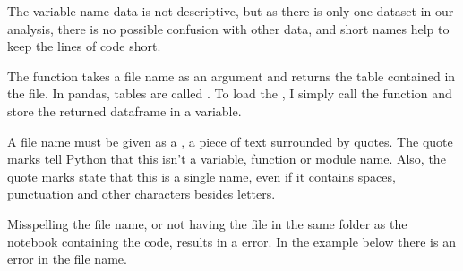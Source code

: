 \documentclass[letterpaper,10pt,english]{sphinxmanual}
\begin{document}
The variable name data is not descriptive, but as there is only one dataset in our analysis, there is no possible confusion with other data, and short names help to keep the lines of code short.

The function  takes a file name as an argument and returns the table contained in the file. In pandas, tables are called  . To load the , I simply call the function and store the returned dataframe in a variable.

A file name must be given as a  , a piece of text surrounded by quotes. The quote marks tell Python that this isn’t a variable, function or module name. Also, the quote marks state that this is a single name, even if it contains spaces, punctuation and other characters besides letters.

Misspelling the file name, or not having the file in the same folder as the notebook containing the code, results in a  error. In the example below there is an error in the file name.

\end{document}
